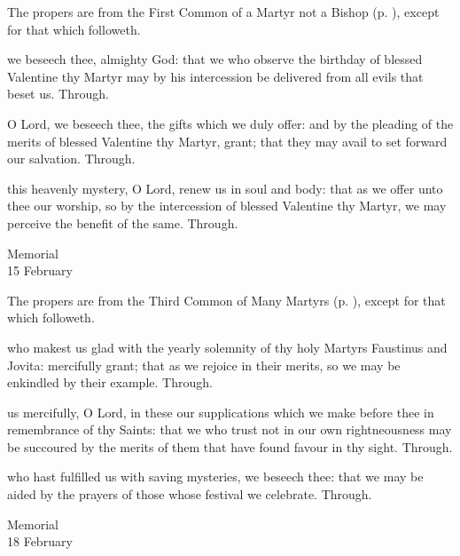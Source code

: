 \begin{rubric}
	The propers are from the First Common of a Martyr not a Bishop (p. \pageref{CommonMartyrNotBishopI}), except for that which followeth.
\end{rubric}

\collect
{} we beseech thee, almighty God: that we who observe the birthday of blessed Valentine thy Martyr may by his intercession be delivered from all evils that beset us. Through.

\secret
{} O Lord, we beseech thee, the gifts which we duly offer: and by the pleading of the merits of blessed Valentine thy Martyr, grant; that they may avail to set forward our salvation. Through.

\postcommunion
{} this heavenly mystery, O Lord, renew us in soul and body: that as we offer unto thee our worship, so by the intercession of blessed Valentine thy Martyr, we may perceive the benefit of the same. Through.


\begin{inhead}
    {Memorial\\
15 February}
\end{inhead}

\begin{rubric}
	The propers are from the Third Common of Many Martyrs (p. \pageref{CommonMartyrsIII}), except for that which followeth.
\end{rubric}

\collect
{} who makest us glad with the yearly solemnity of thy holy Martyrs Faustinus and Jovita: mercifully grant; that as we rejoice in their merits, so we may be enkindled by their example. Through.

\secret
{} us mercifully, O Lord, in these our supplications which we make before thee in remembrance of thy Saints: that we who trust not in our own rightneousness may be succoured by the merits of them that have found favour in thy sight. Through.

\postcommunion
{} who hast fulfilled us with saving mysteries, we beseech thee: that we may be aided by the prayers of those whose festival we celebrate. Through.


\begin{inhead}
    {Memorial\\
18 February}
\end{inhead}

